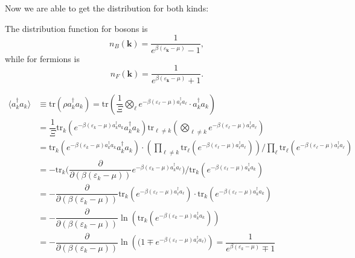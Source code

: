 \documentclass[b5paper,10pt,UTF8]{book}
\numberwithin{equation}{section}
\begin{document}
		Now we are able to get the distribution for both kinds:
		\begin{Proposition}
			The distribution function for bosons is
			\begin{equation}
				n_B(\bm{k})=\dfrac{1}{e^{\beta(\varepsilon_{\bm{k}}-\mu)}-1},
			\end{equation}
			while for fermions is
			\begin{equation}
				n_F(\bm{k})=\dfrac{1}{e^{\beta(\varepsilon_{\bm{k}}-\mu)}+1}.
			\end{equation}
		\end{Proposition}
		\begin{Proof}
			\begin{align*}
				\langle a_k^\dagger a_k\rangle&\equiv\mathrm{tr}(\rho a_k^\dagger a_k)=\mathrm{tr}\left(\dfrac{1}{\varXi}\bigotimes_\ell e^{-\beta(\varepsilon_\ell-\mu)a_\ell^\dagger a_\ell}\cdot a_k^\dagger a_k\right)\\
				&=\dfrac{1}{\varXi}\mathrm{tr}_k\left(e^{-\beta(\varepsilon_k-\mu)a_k^\dagger a_k}a_k^\dagger a_k\right)\mathrm{tr}_{\ell\neq k}\left(\bigotimes_{\ell\neq k}e^{-\beta(\varepsilon_\ell-\mu)a_\ell^\dagger a_\ell}\right)\\
				&=\mathrm{tr}_k\left(e^{-\beta(\varepsilon_k-\mu)a_k^\dagger a_k}a_k^\dagger a_k\right)\cdot\left(\prod_{\ell\neq k}\mathrm{tr}_\ell\left(e^{-\beta(\varepsilon_\ell-\mu)a_\ell^\dagger a_\ell}\right)\right)\bigg/\prod_\ell\mathrm{tr}_\ell\left(e^{-\beta(\varepsilon_\ell-\mu)a_\ell^\dagger a_\ell}\right)\\
				&=-\mathrm{tr}_k\bigg(\dfrac{\partial}{\partial(\beta(\varepsilon_k-\mu))}e^{-\beta(\varepsilon_k-\mu)a_k^\dagger a_\ell}\bigg) \bigg/\mathrm{tr}_k\left(e^{-\beta(\varepsilon_\ell-\mu)a_k^\dagger a_k}\right)\\
				&=-\dfrac{\partial}{\partial(\beta(\varepsilon_k-\mu))}\mathrm{tr}_k\left(e^{-\beta(\varepsilon_\ell-\mu)a_\ell^\dagger a_\ell}\right)\cdot\mathrm{tr}_k\left(e^{-\beta(\varepsilon_\ell-\mu)a_k^\dagger a_k}\right)\\
				&=-\dfrac{\partial}{\partial(\beta(\varepsilon_k-\mu))}\ln\left(\mathrm{tr}_k\left(e^{-\beta(\varepsilon_k-\mu)a_k^\dagger a_k}\right)\right)\\
				&=-\dfrac{\partial}{\partial(\beta(\varepsilon_k-\mu))}\ln \left((1\mp e^{-\beta(\varepsilon_\ell-\mu)a_\ell^\dagger a_\ell)}\right)=\dfrac{1}{e^{\beta(\varepsilon_k-\mu)}\mp1}
			\end{align*}
		\end{Proof}
\end{document}
